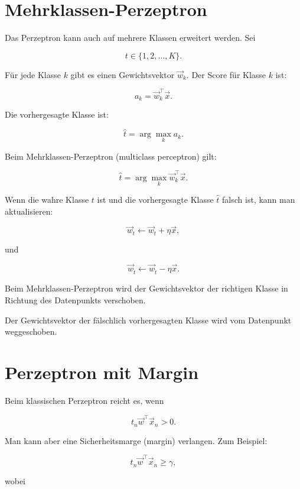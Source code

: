 \section{Mehrklassen-Perzeptron}

Das Perzeptron kann auch auf mehrere Klassen erweitert werden.
Sei

\[
    t \in \{1,2,\dots,K\}.
\]

Für jede Klasse \(k\) gibt es einen Gewichtsvektor \(\vec{w}_k\).
Der Score für Klasse \(k\) ist:

\[
    a_k
    =
    \vec{w}_k^{\top}\vec{x}.
\]

Die vorhergesagte Klasse ist:

\[
    \hat{t}
    =
    \arg\max_{k}
    a_k.
\]

\begin{definitionbox}
Beim Mehrklassen-Perzeptron (multiclass perceptron) gilt:

\[
    \hat{t}
    =
    \arg\max_{k}
    \vec{w}_k^{\top}\vec{x}.
\]
\end{definitionbox}

Wenn die wahre Klasse \(t\) ist und die vorhergesagte Klasse \(\hat{t}\) falsch ist, kann man aktualisieren:

\[
    \vec{w}_t
    \leftarrow
    \vec{w}_t+\eta\vec{x},
\]

und

\[
    \vec{w}_{\hat{t}}
    \leftarrow
    \vec{w}_{\hat{t}}-\eta\vec{x}.
\]

\begin{conceptbox}
Beim Mehrklassen-Perzeptron wird der Gewichtsvektor der richtigen Klasse in Richtung des Datenpunkts verschoben.

Der Gewichtsvektor der fälschlich vorhergesagten Klasse wird vom Datenpunkt weggeschoben.
\end{conceptbox}

\section{Perzeptron mit Margin}

Beim klassischen Perzeptron reicht es, wenn

\[
    t_n\vec{w}^{\top}\vec{x}_n>0.
\]

Man kann aber eine Sicherheitsmarge (margin) verlangen.
Zum Beispiel:

\[
    t_n\vec{w}^{\top}\vec{x}_n \geq \gamma,
\]

wobei

